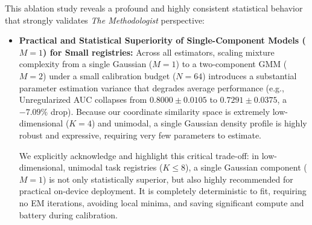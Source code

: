 This ablation study reveals a profound and highly consistent statistical behavior that strongly validates {\em The Methodologist} perspective:
\begin{itemize}
    \item {\bf Practical and Statistical Superiority of Single-Component Models ($M=1$) for Small registries:} Across all estimators, scaling mixture complexity from a single Gaussian ($M=1$) to a two-component GMM ($M=2$) under a small calibration budget ($N=64$) introduces a substantial parameter estimation variance that degrades average performance (e.g., Unregularized AUC collapses from $0.8000 \pm 0.0105$ to $0.7291 \pm 0.0375$, a $-7.09\%$ drop). Because our coordinate similarity space is extremely low-dimensional ($K=4$) and unimodal, a single Gaussian density profile is highly robust and expressive, requiring very few parameters to estimate. 
    
    We explicitly acknowledge and highlight this critical trade-off: in low-dimensional, unimodal task registries ($K \le 8$), a single Gaussian component ($M=1$) is not only statistically superior, but also highly recommended for practical on-device deployment. It is completely deterministic to fit, requiring no EM iterations, avoiding local minima, and saving significant compute and battery during calibration.
    

\end{itemize}
